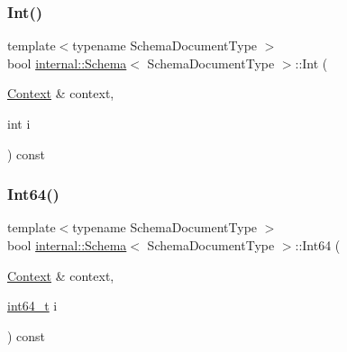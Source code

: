 \mbox{\label{classinternal_1_1Schema_a1e3a87b01db90408be438dd4f5b8ee28}} 
\subsubsection{\texorpdfstring{Int()}{Int()}}
{\footnotesize\ttfamily template$<$typename Schema\+Document\+Type $>$ \\
bool \hyperlink{classinternal_1_1Schema}{internal\+::\+Schema}$<$ Schema\+Document\+Type $>$\+::Int (\begin{DoxyParamCaption}\item[{\hyperlink{classinternal_1_1Schema_ac3f54abfefe300c5610c1205869cfd66}{Context} \&}]{context,  }\item[{int}]{i }\end{DoxyParamCaption}) const\hspace{0.3cm}{\ttfamily [inline]}}

\mbox{\label{classinternal_1_1Schema_a0190028fee83533e2b93f19ff5a99902}} 
\subsubsection{\texorpdfstring{Int64()}{Int64()}}
{\footnotesize\ttfamily template$<$typename Schema\+Document\+Type $>$ \\
bool \hyperlink{classinternal_1_1Schema}{internal\+::\+Schema}$<$ Schema\+Document\+Type $>$\+::Int64 (\begin{DoxyParamCaption}\item[{\hyperlink{classinternal_1_1Schema_ac3f54abfefe300c5610c1205869cfd66}{Context} \&}]{context,  }\item[{\hyperlink{stdint_8h_a414156feea104f8f75b4ed9e3121b2f6}{int64\+\_\+t}}]{i }\end{DoxyParamCaption}) const\hspace{0.3cm}{\ttfamily [inline]}}

\mbox{\label{classinternal_1_1Schema_a60f7d6fe83273d9d46d4f59a59fc0593}} 

